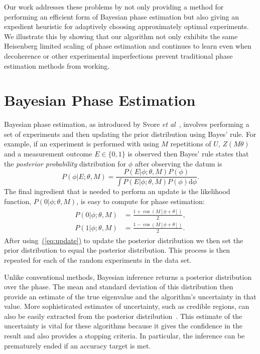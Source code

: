 \documentclass[aps,pra,amsmath,twocolumn,amssymb,superscriptaddress]{revtex4-1}
\newcommand{\eq}[1]{\hyperref[eq:#1]{(\ref*{eq:#1})}}
\newcommand{\etal}{\emph{et al}}
\begin{document}
Our work addresses these problems by not only providing a method for
performing an efficient form of Bayesian phase estimation but also giving an
expedient heuristic for adaptively choosing approximately optimal experiments.
We illustrate this by showing that our algorithm not only exhibits the same
Heisenberg limited scaling of phase estimation and
continues to learn even when decoherence or other experimental imperfections prevent traditional phase estimation
methods from working.

\section{Bayesian Phase Estimation}
\label{sec:bayesian-phase-est}


Bayesian phase estimation, as introduced by Svore \etal~\cite{SHF14}, involves performing a 
set of experiments and then updating the prior distribution using Bayes' rule.
For example, if an experiment is performed with using $M$ repetitions of $U$,
$Z(M \theta)$ and a measurement outcome $E\in \{0,1\}$ is observed then Bayes'
rule states that the \emph{posterior probability} distribution for $\phi$
after observing the datum is
\begin{equation}
P(\phi|E;\theta,M) = \frac{P(E|\phi;\theta,M)P(\phi)}{\int P(E|\phi;\theta,M)P(\phi)\mathrm{d}{\phi}}.\label{eq:update}
\end{equation}
The final ingredient that is needed to perform an update is the likelihood function, $P(0|\phi;\theta,M)$, is easy to compute for phase estimation:
\begin{gather}
    \label{eq:likenodecohere}
    \begin{aligned}
        P(0|\phi;\theta,M) & = \frac{1+\cos(M[\phi +\theta])}{2},\\
        P(1|\phi;\theta,M) & = \frac{1-\cos(M[\phi +\theta])}{2}.
    \end{aligned}
\end{gather}
After using~\eq{update} to update the posterior distribution we then set the prior distribution to equal the posterior distribution.  This process is then repeated for each of the random experiments in the data set.

Unlike conventional methods, Bayesian inference returns a posterior distribution over the
phase. The mean and standard deviation of this distribution then provide an estimate of the
true eigenvalue and the algorithm's uncertainty in that value. More sophisticated estimates of uncertainty, such as credible
regions, can also be easily extracted from the posterior
distribution~\cite{granade_robust_2012}.  This estimate of the uncertainty is
vital for these algorithms because it gives the confidence in the
result and also provides a stopping criteria.  In particular, the inference can be prematurely ended if
an accuracy target is met.
\end{document}
